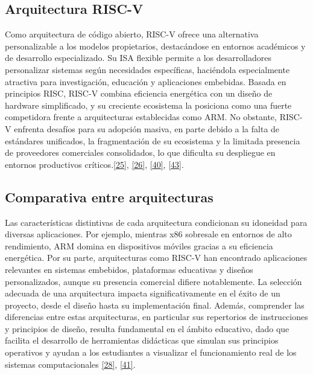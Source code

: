 \documentclass[12pt,oneside]{templates/unerthesis}
\begin{document}
\hypertarget{arquitectura-risc-v}{%
\subsection{Arquitectura RISC-V}\label{arquitectura-risc-v}}

Como arquitectura de código abierto, RISC-V ofrece una alternativa personalizable a los modelos propietarios, destacándose en entornos académicos y de desarrollo especializado. Su ISA flexible permite a los desarrolladores personalizar sistemas según necesidades específicas, haciéndola especialmente atractiva para investigación, educación y aplicaciones embebidas. Basada en principios RISC, RISC-V combina eficiencia energética con un diseño de hardware simplificado, y su creciente ecosistema la posiciona como una fuerte competidora frente a arquitecturas establecidas como ARM. No obstante, RISC-V enfrenta desafíos para su adopción masiva, en parte debido a la falta de estándares unificados, la fragmentación de su ecosistema y la limitada presencia de proveedores comerciales consolidados, lo que dificulta su despliegue en entornos productivos críticos.\protect\hyperlink{ref-waterman_risc-v_2014}{{[}25{]}}, \protect\hyperlink{ref-harris2015digital}{{[}26{]}}, \protect\hyperlink{ref-hennessy2017computer_riscv}{{[}40{]}}, \protect\hyperlink{ref-patterson2016computer}{{[}43{]}}.

\hypertarget{comparativa-entre-arquitecturas}{%
\subsection{Comparativa entre arquitecturas}\label{comparativa-entre-arquitecturas}}

Las características distintivas de cada arquitectura condicionan su idoneidad para diversas aplicaciones. Por ejemplo, mientras x86 sobresale en entornos de alto rendimiento, ARM domina en dispositivos móviles gracias a su eficiencia energética. Por su parte, arquitecturas como RISC-V han encontrado aplicaciones relevantes en sistemas embebidos, plataformas educativas y diseños personalizados, aunque su presencia comercial difiere notablemente. La selección adecuada de una arquitectura impacta significativamente en el éxito de un proyecto, desde el diseño hasta su implementación final. Además, comprender las diferencias entre estas arquitecturas, en particular sus repertorios de instrucciones y principios de diseño, resulta fundamental en el ámbito educativo, dado que facilita el desarrollo de herramientas didácticas que simulan sus principios operativos y ayudan a los estudiantes a visualizar el funcionamiento real de los sistemas computacionales \protect\hyperlink{ref-patterson_computer_2014}{{[}28{]}}, \protect\hyperlink{ref-arm_evolution_2025}{{[}41{]}}.
\end{document}
